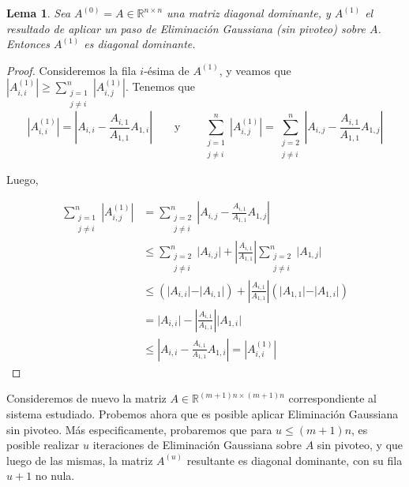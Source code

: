 \documentclass[11pt, a4paper, spanish]{article}
\theoremstyle{plain}
\newtheorem{lema}{Lema}
\theoremstyle{remark}
\begin{document}
      \begin{lema}
        \label{lema:EG conserva diagonal dominante}
        Sea $A^{(0)} = A \in \mathbb{R}^{n \times n}$ una matriz diagonal dominante, y $A^{(1)}$ el resultado de aplicar un paso de Eliminación Gaussiana (sin pivoteo) sobre $A$. Entonces $A^{(1)}$ es diagonal dominante.
      \end{lema}
      \begin{proof}
        Consideremos la fila $i$-ésima de $A^{(1)}$, y veamos que $\left \vert A^{(1)}_{i,i} \right \vert \geq \sum_{\substack{j = 1 \\ j \neq i}}^n \left \vert A^{(1)}_{i,j} \right \vert$. Tenemos que
        \[ \left \vert A^{(1)}_{i,i} \right \vert = \left \vert A_{i,i} - \frac{A_{i,1}}{A_{1,1}} A_{1,i} \right \vert
          \qquad \text{y} \qquad
        \sum_{\substack{j = 1 \\ j \neq i}}^n \left \vert A^{(1)}_{i,j} \right \vert
          = \sum_{\substack{j = 2 \\ j \neq i}}^n \left \vert A_{i,j} - \frac{A_{i,1}}{A_{1,1}} A_{1,j} \right \vert \]

        Luego,

        \[ \begin{split}
          \sum_{\substack{j = 1 \\ j \neq i}}^n \left \vert A^{(1)}_{i,j} \right \vert
          &= \sum_{\substack{j = 2 \\ j \neq i}}^n \left \vert A_{i,j} - \frac{A_{i,1}}{A_{1,1}} A_{1,j} \right \vert \\
          &\leq \sum_{\substack{j = 2 \\ j \neq i}}^n \vert A_{i,j} \vert + \left \vert \frac{A_{i,1}}{A_{1,1}} \right \vert \sum_{\substack{j = 2 \\ j \neq i}}^n \vert A_{1,j} \vert \\
          &\leq \left( \vert A_{i,i} \vert - \vert A_{i,1} \vert \right) + \left \vert \frac{A_{i,1}}{A_{1,1}} \right \vert \left( \vert A_{1,1} \vert - \vert A_{1,i} \vert \right) \\
          &= \vert A_{i,i} \vert - \left \vert \frac{A_{i,1}}{A_{1,1}} \right \vert \vert A_{1,i} \vert \\
          &\leq \left \vert A_{i,i} -  \frac{A_{i,1}}{A_{1,1}} A_{1,i} \right \vert = \left \vert A^{(1)}_{i,i} \right \vert
        \end{split} \]
      \end{proof}

      Consideremos de nuevo la matriz $A \in \mathbb{R}^{(m+1)n \times (m+1)n}$ correspondiente al sistema estudiado. Probemos ahora que es posible aplicar Eliminación Gaussiana sin pivoteo. Más especificamente, probaremos que para $u \leq (m+1)n$, es posible realizar $u$ iteraciones de Eliminación Gaussiana sobre $A$ sin pivoteo, y que luego de las mismas, la matriz $A^{(u)}$ resultante es diagonal dominante, con su fila $u + 1$ no nula.
\end{document}

